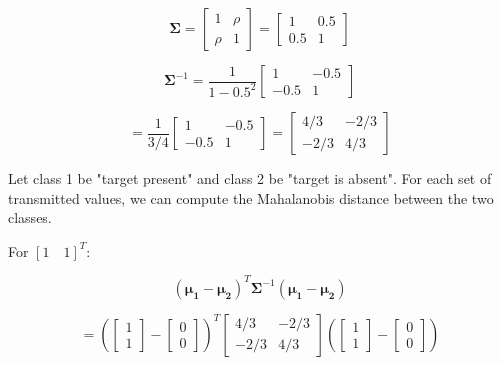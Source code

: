 \documentclass[fleqn]{article}
\begin{document}
\begin{enumerate}
\begin{enumerate}
			\begin{equation*}
				\mathbf{\Sigma} = \begin{bmatrix}
					1 & \rho\\
					\rho & 1
				\end{bmatrix} = \begin{bmatrix}
					1 & 0.5\\
					0.5 & 1
				\end{bmatrix}
			\end{equation*}
			
			\begin{equation*}
				\mathbf{\Sigma}^{-1} = \frac{1}{1 - 0.5^2}\begin{bmatrix} 1 & -0.5 \\ -0.5 & 1 \end{bmatrix}
			\end{equation*}
			
			\begin{equation*}
				 = \frac{1}{3/4}\begin{bmatrix} 1 & -0.5 \\ -0.5 & 1 \end{bmatrix} = \begin{bmatrix} 4/3 & -2/3 \\ -2/3 & 4/3 \end{bmatrix}
			\end{equation*}
			
			Let class 1 be "target present" and class 2 be "target is absent". For each set of transmitted values, we can compute the Mahalanobis distance between the two classes.
			
			For $[1 \quad 1]^T$:
			
			\begin{equation*}
				(\mathbf{\mu_1} - \mathbf{\mu_2})^T\mathbf{\Sigma}^{-1}(\mathbf{\mu_1} - \mathbf{\mu_2})
			\end{equation*}
			
			 \begin{equation*}
				= \left(\begin{bmatrix} 1 \\ 1 \end{bmatrix} - \begin{bmatrix} 0 \\ 0 \end{bmatrix}\right)^T\begin{bmatrix} 4/3 & -2/3 \\ -2/3 & 4/3 \end{bmatrix}\left(\begin{bmatrix} 1 \\ 1 \end{bmatrix} - \begin{bmatrix} 0 \\ 0 \end{bmatrix}\right)
			\end{equation*}
			

\end{enumerate}
\end{enumerate}
\end{document}
